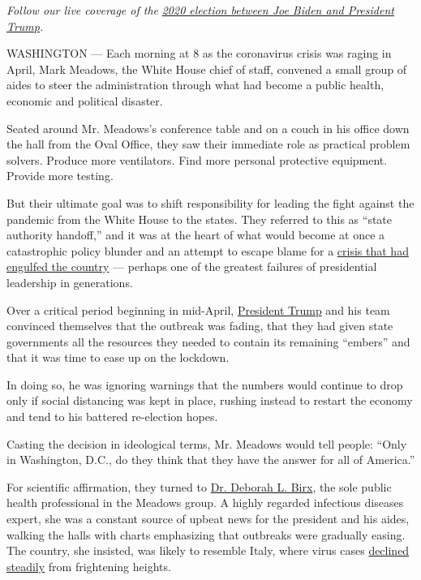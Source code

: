 \emph{Follow our live coverage of the}
\href{https://www.nytimes3xbfgragh.onion/2020/07/27/us/elections/biden-vs-trump.html}{\emph{2020
election between Joe Biden and President Trump}}\emph{.}

WASHINGTON --- Each morning at 8 as the coronavirus crisis was raging in
April, Mark Meadows, the White House chief of staff, convened a small
group of aides to steer the administration through what had become a
public health, economic and political disaster.

Seated around Mr. Meadows's conference table and on a couch in his
office down the hall from the Oval Office, they saw their immediate role
as practical problem solvers. Produce more ventilators. Find more
personal protective equipment. Provide more testing.

But their ultimate goal was to shift responsibility for leading the
fight against the pandemic from the White House to the states. They
referred to this as ``state authority handoff,'' and it was at the heart
of what would become at once a catastrophic policy blunder and an
attempt to escape blame for a
\href{https://www.nytimes3xbfgragh.onion/2020/08/06/us/united-states-failure-coronavirus.html}{crisis
that had engulfed the country} --- perhaps one of the greatest failures
of presidential leadership in generations.

Over a critical period beginning in mid-April,
\href{https://www.nytimes3xbfgragh.onion/2020/07/28/us/politics/donald-fred-trump.html}{President
Trump} and his team convinced themselves that the outbreak was fading,
that they had given state governments all the resources they needed to
contain its remaining ``embers'' and that it was time to ease up on the
lockdown.

In doing so, he was ignoring warnings that the numbers would continue to
drop only if social distancing was kept in place, rushing instead to
restart the economy and tend to his battered re-election hopes.

Casting the decision in ideological terms, Mr. Meadows would tell
people: ``Only in Washington, D.C., do they think that they have the
answer for all of America.''

For scientific affirmation, they turned to
\href{https://www.state.gov/biographies/deborah-l-birx-md/}{Dr. Deborah
L. Birx}, the sole public health professional in the Meadows group. A
highly regarded infectious diseases expert, she was a constant source of
upbeat news for the president and his aides, walking the halls with
charts emphasizing that outbreaks were gradually easing. The country,
she insisted, was likely to resemble Italy, where virus cases
\href{https://www.nytimes3xbfgragh.onion/interactive/2020/world/europe/italy-coronavirus-cases.html}{declined
steadily} from frightening heights.

